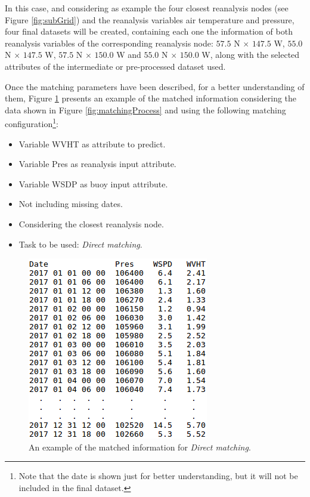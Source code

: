 \documentclass[energies,article,submit,moreauthors,pdftex]{Definitions/mdpi}
\begin{document}
\begin{itemize}[leftmargin=*,labelsep=5.8mm]
\begin{itemize}[leftmargin=*,labelsep=5.8mm]
							In this case, and considering as example the four closest reanalysis nodes (see Figure \ref{fig:subGrid}) and the reanalysis variables air temperature and pressure, four final datasets will be created, containing each one the information of both reanalysis variables of the corresponding reanalysis node: $57.5$ N $\times$ $147.5$ W, $55.0$ N $\times$ $147.5$ W, $57.5$ N $\times$ $150.0$ W and $55.0$ N $\times$ $150.0$ W, along with the selected attributes of the intermediate or pre-processed dataset used.
							
						\end{itemize}
					
				\end{itemize}
						
				Once the matching parameters have been described, for a better understanding of them, Figure \ref{fig:directMatching} presents an example of the matched information considering the data shown in Figure \ref{fig:matchingProcess} and using the following matching configuration\footnote{Note that the date is shown just for better understanding, but it will not be included in the final dataset.}:
					\begin{itemize}[leftmargin=*,labelsep=5.8mm]
						\item Variable WVHT as attribute to predict.
						\item Variable Pres as reanalysis input attribute.
						\item Variable WSDP as buoy input attribute.
						\item Not including missing dates.
						\item Considering the closest reanalysis node.
						\item Task to be used: \textit{Direct matching}.
					\end{itemize}
						
				\begin{figure}[H]
					\centering
					\includegraphics[scale=0.49]{figures/FigureDirectMatching.png}
					\caption{An example of the matched information for \textit{Direct matching}.}
					\label{fig:directMatching}
				\end{figure}
				
\end{document}
